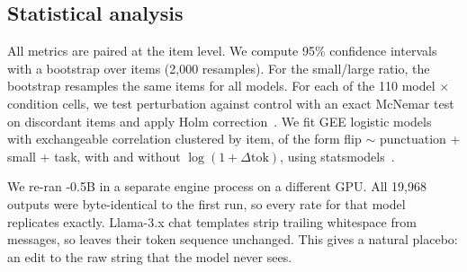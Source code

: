 \subsection{Statistical analysis}
All metrics are paired at the item level.
We compute 95\% confidence intervals with a bootstrap over items (2,000 resamples). For the small/large ratio, the bootstrap resamples the same items for all models.
For each of the 110 model $\times$ condition cells, we test perturbation against control with an exact McNemar test on discordant items and apply Holm correction~\cite{holm1979simple}.
We fit GEE logistic models~\cite{liang1986longitudinal} with exchangeable correlation clustered by item, of the form flip $\sim$ punctuation + small + task, with and without $\log(1+\Delta\text{tok})$, using statsmodels~\cite{seabold2010statsmodels}.

We re-ran \qwentwo-0.5B in a separate engine process on a different GPU. All 19,968 outputs were byte-identical to the first run, so every rate for that model replicates exactly.
Llama-3.x chat templates strip trailing whitespace from messages, so  leaves their token sequence unchanged. This gives a natural placebo: an edit to the raw string that the model never sees.
